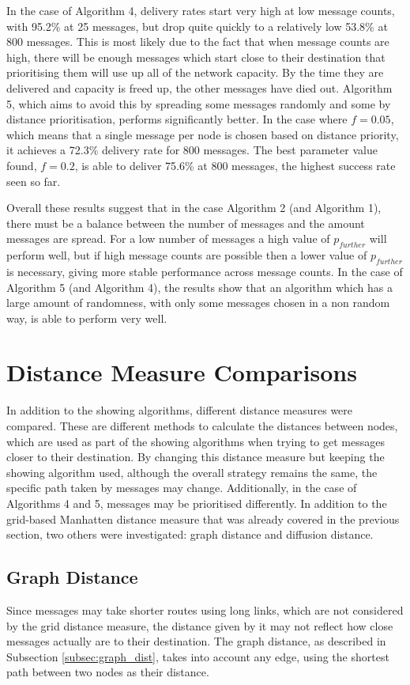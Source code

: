\documentclass[bsc,frontabs,twoside,singlespacing,parskip,deptreport]{infthesis}     %
\begin{document}
In the case of Algorithm 4, delivery rates start very high at low message counts, with 95.2\% at 25 messages, but drop quite quickly to a relatively low 53.8\% at 800 messages. This is most likely due to the fact that when message counts are high, there will be enough messages which start close to their destination that prioritising them will use up all of the network capacity. By the time they are delivered and capacity is freed up, the other messages have died out. Algorithm 5, which aims to avoid this by spreading some messages randomly and some by distance prioritisation, performs significantly better. In the case where $f=0.05$, which means that a single message per node is chosen based on distance priority, it achieves a 72.3\% delivery rate for 800 messages. The best parameter value found, $f=0.2$, is able to deliver 75.6\% at 800 messages, the highest success rate seen so far.

Overall these results suggest that in the case Algorithm 2 (and Algorithm 1), there must be a balance between the number of messages and the amount messages are spread. For a low number of messages a high value of $p_{further}$ will perform well, but if high message counts are possible then a lower value of $p_{further}$ is necessary, giving more stable performance across message counts. In the case of Algorithm 5 (and Algorithm 4), the results show that an algorithm which has a large amount of randomness, with only some messages chosen in a non random way, is able to perform very well.

\section{Distance Measure Comparisons}
In addition to the showing algorithms, different distance measures were compared. These are different methods to calculate the distances between nodes, which are used as part of the showing algorithms when trying to get messages closer to their destination. By changing this distance measure but keeping the showing algorithm used, although the overall strategy remains the same, the specific path taken by messages may change. Additionally, in the case of Algorithms 4 and 5, messages may be prioritised differently. In addition to the grid-based Manhatten distance measure that was already covered in the previous section, two others were investigated: graph distance and diffusion distance.

\subsection{Graph Distance}
Since messages may take shorter routes using long links, which are not considered by the grid distance measure, the distance given by it may not reflect how close messages actually are to their destination. The graph distance, as described in Subsection \ref{subsec:graph_dist}, takes into account any edge, using the shortest path between two nodes as their distance.
\end{document}
